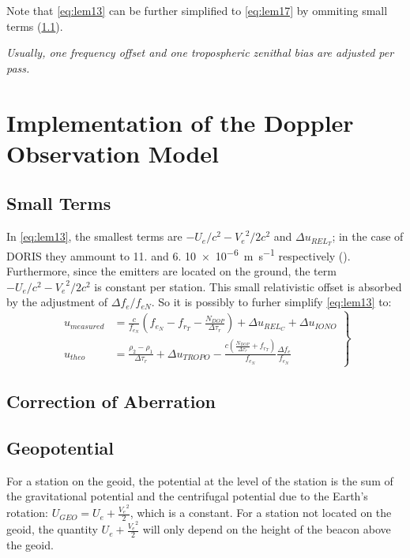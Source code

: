 Note that \ref{eq:lem13} can be further simplified to \ref{eq:lem17} by ommiting small terms (\ref{ssec:small-terms}).

\emph{Usually, one frequency offset and one tropospheric zenithal bias are adjusted per pass.}

\section{Implementation of the Doppler Observation Model}

\subsection{Small Terms}
\label{ssec:small-terms}

In \ref{eq:lem13}, the smallest terms are \(-U_e / c^2 - {V_e}^2 / 2 c^2\) and 
\(\Delta u_{{REL}_T}\); in the case of DORIS they ammount to \num{11.} and \num{6.} \SI{10e-6}{\meter\per\second} 
respectively (\cite{lemoine-2016}). Furthermore, since the emitters are located on the 
ground, the term \(-U_e / c^2 - {V_e}^2 / 2 c^2\) is constant per station. This small 
relativistic offset is absorbed by the adjustment of \(\Delta f_e / f_{eN}\). So it is 
possibly to furher simplify \ref{eq:lem13} to:
\begin{equation}
    \label{eq:lem17}
    \left.\begin{aligned}
        u_{measured} & = \frac{c}{f_{e_N}} (f_{e_N} - f_{r_T} -
         \frac{N_{DOP}}{\Delta\tau_r}) + \Delta u_{{REL}_C} + \Delta u_{IONO}\\
        u_{theo} &= \frac{\rho_2 - \rho_1}{\Delta\tau_r} + \Delta u_{TROPO} - \frac{c(\frac{N_{DOP}}{\Delta\tau_r} + f_{r_T})}{f_{e_N}} \frac{\Delta f_e}{f_{e_N}}
    \end{aligned}
\right\}
\end{equation}

\subsection{Correction of Aberration}

\subsection{Geopotential}
For a station on the geoid, the potential at the level of the station is the sum 
of the gravitational potential and the centrifugal potential due to the Earth's 
rotation: \(U_{GEO} = U_e + \frac{{V_e}^2}{2}\), which is a constant. For a station 
not located on the geoid, the quantity \(U_e + \frac{{V_e}^2}{2}\) will only depend 
on the height of the beacon above the geoid.

